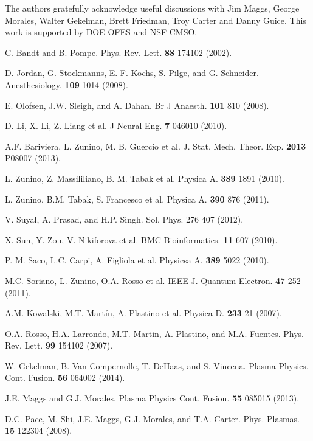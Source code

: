 \documentclass[aps,prx,twocolumn,secnumarabic,nobalancelastpage,amsmath,amssymb,
nofootinbib]{revtex4-1}
\begin{document}
The authors gratefully acknowledge useful discussions with Jim Maggs, George Morales, Walter Gekelman, Brett Friedman, Troy Carter and Danny Guice. This work is supported by DOE OFES and NSF CMSO.

\begin{thebibliography}{99}
C. Bandt and B. Pompe. Phys. Rev. Lett. {\bf 88} 174102 (2002).

D. Jordan, G. Stockmanns, E. F. Kochs, S. Pilge, and G. Schneider. Anesthesiology. {\bf 109} 1014 (2008).

E. Olofsen, J.W. Sleigh, and A. Dahan. Br J Anaesth. {\bf 101} 810 (2008).

D. Li, X. Li, Z. Liang et al. J Neural Eng. {\bf 7} 046010 (2010).

A.F. Bariviera, L. Zunino, M. B. Guercio et al. J. Stat. Mech. Theor. Exp. {\bf 2013} P08007 (2013).

L. Zunino, Z. Massililiano, B. M. Tabak et al. Physica A. {\bf 389} 1891 (2010).

L. Zunino, B.M. Tabak, S. Francesco et al. Physica A. {\bf 390} 876 (2011).

V. Suyal, A. Prasad, and H.P. Singh. Sol. Phys. {\b 276} 407 (2012).

X. Sun, Y. Zou, V. Nikiforova et al. BMC Bioinformatics. {\bf 11} 607 (2010).

P. M. Saco, L.C. Carpi, A. Figliola et al. Physicsa A. {\bf 389} 5022 (2010).

M.C. Soriano, L. Zunino, O.A. Rosso et al. IEEE J. Quantum Electron. {\bf 47} 252 (2011).

A.M. Kowalski, M.T. Mart{\'i}n, A. Plastino et al. Physica D. {\bf 233} 21 (2007).

O.A. Rosso, H.A. Larrondo, M.T. Martin, A. Plastino, and M.A. Fuentes. Phys. Rev. Lett. {\bf 99} 154102 (2007).

W. Gekelman, B. Van Compernolle, T. DeHaas, and S. Vincena. Plasma Physics. Cont. Fusion. {\bf 56} 064002 (2014).

J.E. Maggs and G.J. Morales. Plasma Physics Cont. Fusion. {\bf 55} 085015 (2013).

D.C. Pace, M. Shi, J.E. Maggs, G.J. Morales, and T.A. Carter. Phys. Plasmas. {\bf 15} 122304 (2008).


\end{thebibliography}
\end{document}
